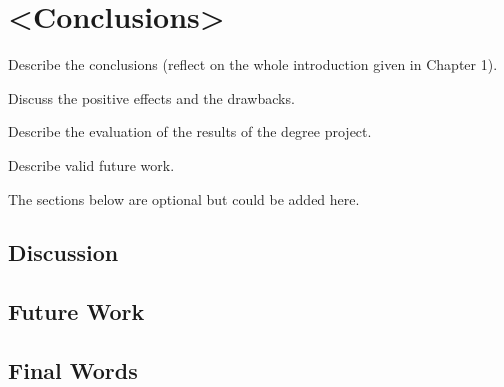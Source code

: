\section{<Conclusions> }
Describe the conclusions (reflect on the whole introduction given in Chapter 1). 

Discuss the positive effects and the drawbacks. 

Describe the evaluation of the results of the degree project.

Describe valid future work.  

The sections below are optional but could be added here.

\subsection{Discussion}

\subsection{Future Work}

\subsection{Final Words}







